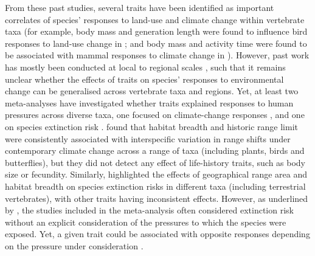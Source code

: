 From these past studies, several traits have been identified as important correlates of species' responses to land-use and climate change within vertebrate taxa (for example, body mass and generation length were found to influence bird responses to land-use change in \citet{Newbold2013}; and body mass and activity time were found to be associated with mammal responses to climate change in \citet{Mccain2014}). However, past work has mostly been conducted at local to regional scales \citep{Hevia2017, Davison2021}, such that it remains unclear whether the effects of traits on species' responses to environmental change can be generalised across vertebrate taxa and regions. Yet, at least two meta-analyses have investigated whether traits explained responses to human pressures across diverse taxa, one focused on climate-change responses \citep{MacLean2017}, and one on species extinction risk \citep{Chichorro2019}. \citet{MacLean2017} found that habitat breadth and historic range limit were consistently associated with interspecific variation in range shifts under contemporary climate change across a range of taxa (including plants, birds and butterflies), but they did not detect any effect of life-history traits, such as body size or fecundity. Similarly, \citet{Chichorro2019} highlighted the effects of geographical range area and habitat breadth on species extinction risks in different taxa (including terrestrial vertebrates), with other traits having inconsistent effects. However, as underlined by \citet{Chichorro2019}, the studies included in the meta-analysis often considered extinction risk without an explicit consideration of the pressures to which the species were exposed. Yet, a given trait could be associated with opposite responses depending on the pressure under consideration \citep{GonzalezSuarez2013}. 

